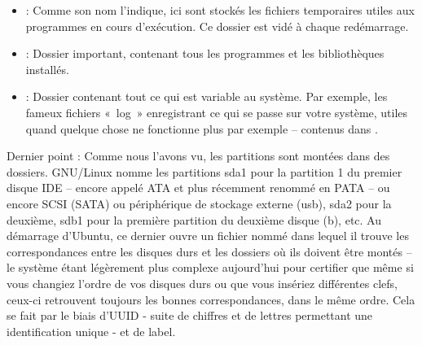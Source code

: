 \begin{itemize}
\item {} : Comme son nom l'indique, ici sont stockés les fichiers temporaires utiles aux programmes en cours d'exécution. Ce dossier est vidé à chaque redémarrage.
\item {} : Dossier important, contenant tous les programmes et les bibliothèques installés.
\item {} : Dossier contenant tout ce qui est variable au système. Par exemple, les fameux fichiers «~log~» enregistrant ce qui se passe sur votre système, utiles quand quelque chose ne fonctionne plus par exemple -- contenus dans .
\end{itemize}
Dernier point : Comme nous l'avons vu, les partitions sont montées dans des dossiers. GNU/Linux nomme les partitions sda1 pour la partition 1 du premier disque IDE -- encore appelé ATA et plus récemment renommé en PATA -- ou encore SCSI (SATA) ou périphérique de stockage externe (usb), sda2 pour la deuxième, sdb1 pour la première partition du deuxième disque (b), etc. Au démarrage d'Ubuntu, ce dernier ouvre un fichier  nommé  dans lequel il trouve les correspondances entre les disques durs et les dossiers où ils doivent être montés -- le système étant légèrement plus complexe aujourd'hui pour certifier que même si vous changiez l'ordre de vos disques durs ou que vous insériez différentes clefs, ceux-ci retrouvent toujours les bonnes correspondances, dans le même ordre. Cela se fait par le biais d'UUID - suite de chiffres et de lettres permettant une identification unique - et de label.
